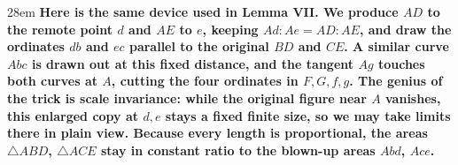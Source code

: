 \documentclass[border=4pt]{standalone}
\begin{document}
\begin{varwidth}{28em}
\large\bfseries
Here is the same device used in Lemma VII. We \textcolor{auxpurple}{produce $AD$ to the remote point      $d$ and $AE$ to $e$}, keeping $Ad : Ae = AD : AE$, and draw the ordinates $db$ and $ec$      parallel to the original $BD$ and $CE$. A \textcolor{auxpurple}{similar curve $Abc$} is drawn out at      this fixed distance, and the \textcolor{auxpurple}{tangent $Ag$} touches both curves at $A$, cutting      the four ordinates in $F, G, f, g$. The genius of the trick is scale invariance: while the      original figure near $A$ vanishes, this enlarged copy at $d, e$ stays a fixed finite size,      so we may take limits there in plain view. Because every length is proportional, the areas      $\triangle ABD$, $\triangle ACE$ stay in constant ratio to the blown-up areas $Abd$, $Ace$.
\end{varwidth}
\end{document}
